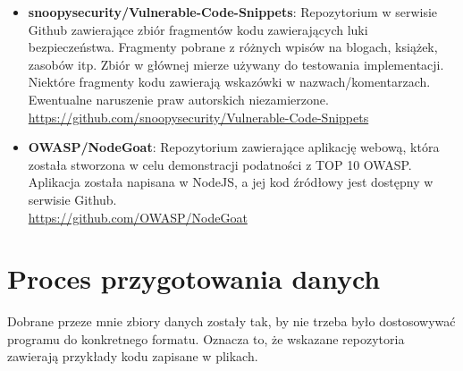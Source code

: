 \begin{itemize}
    \item \textbf{snoopysecurity/Vulnerable-Code-Snippets}: Repozytorium w serwisie Github zawierające zbiór fragmentów kodu zawierających luki bezpieczeństwa. Fragmenty pobrane z różnych wpisów na blogach, książek, zasobów itp. 
    Zbiór w głównej mierze używany do testowania implementacji. Niektóre fragmenty kodu zawierają wskazówki w nazwach/komentarzach. Ewentualne naruszenie praw autorskich niezamierzone.\\ \url{https://github.com/snoopysecurity/Vulnerable-Code-Snippets}



    \item \textbf{OWASP/NodeGoat}: Repozytorium zawierające aplikację webową, która została stworzona w celu demonstracji podatności z TOP 10 OWASP. Aplikacja została napisana w NodeJS, a jej kod źródłowy jest dostępny w serwisie Github.\\ \url{https://github.com/OWASP/NodeGoat}

\end{itemize}

\section{Proces przygotowania danych}
\label{sec:proces_przygotowania_danych}

Dobrane przeze mnie zbiory danych zostały tak, by nie trzeba było dostosowywać programu do konkretnego formatu. Oznacza to, że wskazane repozytoria zawierają przykłady kodu zapisane w plikach.

